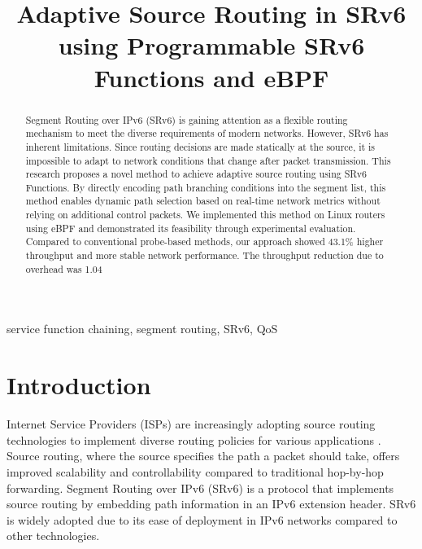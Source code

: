 \documentclass[conference]{IEEEtran}
\begin{document}
\title{Adaptive Source Routing in SRv6 using Programmable SRv6 Functions and eBPF}

\author{
}

\maketitle

\begin{abstract}
  Segment Routing over IPv6 (SRv6) is gaining attention as a flexible routing mechanism to meet the diverse requirements of modern networks.
  However, SRv6 has inherent limitations. Since routing decisions are made statically at the source, it is impossible to adapt to network conditions that change after packet transmission.
  This research proposes a novel method to achieve adaptive source routing using SRv6 Functions.
  By directly encoding path branching conditions into the segment list, this method enables dynamic path selection based on real-time network metrics without relying on additional control packets.
  We implemented this method on Linux routers using eBPF and demonstrated its feasibility through experimental evaluation.
  Compared to conventional probe-based methods, our approach showed 43.1\% higher throughput and more stable network performance.
  The throughput reduction due to overhead was 1.04%
\end{abstract}

\begin{IEEEkeywords}
  service function chaining, segment routing, SRv6, QoS
\end{IEEEkeywords}

\section{Introduction}

Internet Service Providers (ISPs) are increasingly adopting source routing technologies to implement diverse routing policies for various applications \cite{cisco_rakuten_srv6}\cite{softbank_srv6}.
Source routing, where the source specifies the path a packet should take, offers improved scalability and controllability compared to traditional hop-by-hop forwarding.
Segment Routing over IPv6 (SRv6) is a protocol that implements source routing by embedding path information in an IPv6 extension header.
SRv6 is widely adopted due to its ease of deployment in IPv6 networks compared to other technologies.
\end{document}
